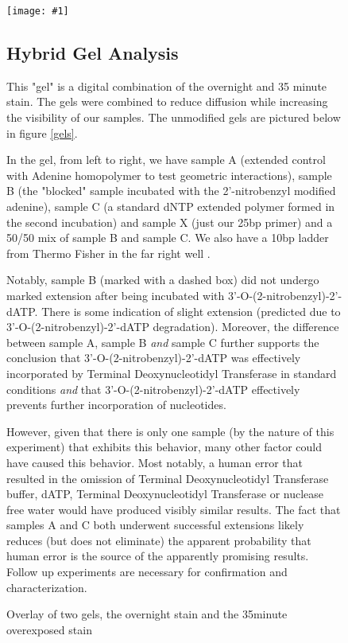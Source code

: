 \documentclass[letterpaper]{article}
\newcommand{\tdt}{Terminal Deoxynucleotidyl Transferase}
\newcommand{\BdATP}{3'-O-(2-nitrobenzyl)-2'-dATP}
\newcommand{\gel}[4]{
\begin{figure}[ht]
\label{#2}
\begin{center}
\texttt{[image: \#1]}
\caption{#2}
\end{center}
\subsection{#3 Analysis}
#4
\end{figure}
}
\begin{document}
\gel{./gels/blocked-annotated.png}{Overlay of two gels, the overnight stain and the 35minute overexposed stain}{Hybrid Gel}{This "gel" is a digital combination of the overnight and 35 minute stain. The gels were combined to reduce diffusion while increasing the visibility of our samples. The unmodified gels are pictured below in figure \ref{gels}. 


In the gel, from left to right, we have sample A (extended control with Adenine homopolymer to test geometric interactions), sample B (the "blocked" sample incubated with the 2'-nitrobenzyl modified adenine), sample C (a standard dNTP extended polymer formed in the second incubation) and sample X (just our 25bp primer) and a 50/50 mix of sample B and sample C. We also have a 10bp ladder from Thermo Fisher in the far right well \cite{10bpladder}.


Notably, sample B (marked with a dashed box) did not undergo marked extension after being incubated with \BdATP{}. There is some indication of slight extension (predicted due to \BdATP{} degradation). Moreover, the difference between sample A, sample B \textit{and} sample C further supports the conclusion that \BdATP{} was effectively incorporated by \tdt{} in standard conditions \textit{and} that \BdATP{} effectively prevents further incorporation of nucleotides.


However, given that there is only one sample (by the nature of this experiment) that exhibits this behavior, many other factor could have caused this behavior. Most notably, a human error that resulted in the omission of \tdt{} buffer, dATP, \tdt{} or nuclease free water would have produced visibly similar results. The fact that samples A and C both underwent successful extensions likely reduces (but does not eliminate) the apparent probability that human error is the source of the apparently promising results. Follow up experiments are necessary for confirmation and characterization.}
\end{document}
